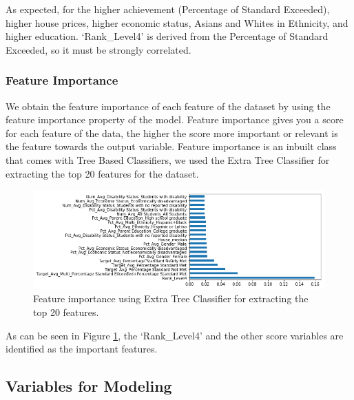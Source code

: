\documentclass[11pt]{article}
\begin{document}
As expected, for the higher achievement (Percentage of Standard Exceeded), higher house prices, higher economic status, Asians and Whites in Ethnicity, and higher education. `Rank\_Level4' is derived from the Percentage of Standard Exceeded, so it must be strongly correlated.

\subsubsection{Feature Importance}

We obtain the feature importance of each feature of the dataset by using the feature importance property of the model.
%
Feature importance gives you a score for each feature of the data, the higher the score more important or relevant is the feature towards the output variable.
%
Feature importance is an inbuilt class that comes with Tree Based Classifiers, we used the Extra Tree Classifier for extracting the top 20 features for the dataset.

\begin{figure}[h!]
\centering 
\includegraphics[width=\textwidth]{output_102_1.png}
\caption{Feature importance using Extra Tree Classifier for extracting the top 20 features.}
  \label{fig:feature_importance_top20}
\end{figure}

As can be seen in Figure \ref{fig:feature_importance_top20}, the `Rank\_Level4'
 and the other score variables are identified as the important features.



\subsection{Variables for Modeling}
\label{Variables for Modeling}
\end{document}
